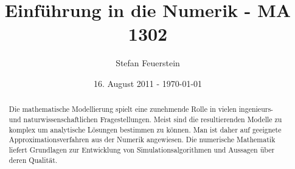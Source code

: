 \documentclass[10pt,a4paper]{article}
\author{Stefan Feuerstein}
\title {Einführung in die Numerik - MA 1302}
\date  {16. August 2011 - \today}
\theoremstyle{definition} \newtheorem{definition}{Definition}[section]
\theoremstyle{remark}     \newtheorem*{bemerkung}{\textbf{Bemerkung}} %
\begin{document}
\maketitle

\begin{abstract}
Die mathematische Modellierung spielt eine zunehmende Rolle in vielen
ingenieurs- und naturwissenschaftlichen Fragestellungen.  Meist sind die
resultierenden Modelle zu komplex um analytische Lösungen bestimmen zu können.
Man ist daher auf geeignete Approximationsverfahren aus der Numerik angewiesen.
Die numerische Mathematik liefert Grundlagen zur Entwicklung von
Simulationsalgorithmen und Aussagen über deren Qualität.
\end{abstract}

\tableofcontents
\pagebreak




\pagebreak
\listofalgorithms
\end{document}
